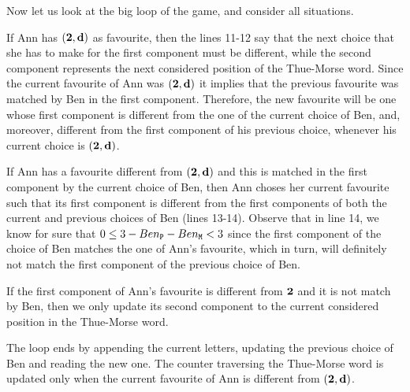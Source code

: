 \documentclass[runningheads,fleqn]{llncs}
\begin{document}
Now let us look at the big loop of the game, and consider all situations. 

If Ann has $(\textbf 2,\textbf d)$ as favourite, then the lines 11-12 say that the next choice that she has to make for the first component must be different, while the second component represents the next considered position of the Thue-Morse word. Since the current favourite of Ann was $(\textbf 2,\textbf d)$ it implies that the previous favourite was matched by Ben in the first component. Therefore, the new favourite will be one whose first component is different from the one of the current choice of Ben, and, moreover, different from the first component of his previous choice, whenever his current choice is $(\textbf 2,\textbf d)$.

If Ann has a favourite different from $(\textbf 2,\textbf d)$ and this is matched in the first component by the current choice of Ben, then Ann choses her current favourite such that its first component is different from the first components of both the current and previous choices of Ben (lines 13-14). Observe that in line 14, we know for sure that $0\leq 3-Ben_{\tt P}-Ben_{\tt M} < 3$ since the first component of the choice of Ben matches the one of Ann's favourite, which in turn, will definitely not match the first component of the previous choice of Ben.

If the first component of Ann's favourite is different from $\textbf 2$ and it is not match by Ben, then we only update its second component to the current considered position in the Thue-Morse word.

The loop ends by appending the current letters, updating the previous choice of Ben and reading the new one. The counter traversing the Thue-Morse word is updated only when the current favourite of Ann is different from $(\textbf 2,\textbf d)$.
\end{document}
